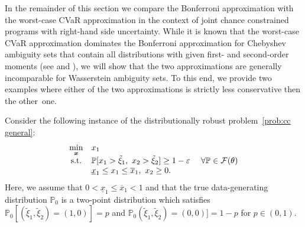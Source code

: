 \documentclass[nonblindrev]{informs2017}
\newcommand{\1}[1]{\mathds{1}{\left(#1\right)}}
\begin{document}
In the remainder of this section we compare the Bonferroni approximation with the worst-case CVaR approximation in the context of joint chance constrained programs with right-hand side uncertainty. While it is known that the worst-case CVaR approximation dominates the Bonferroni approximation for Chebyshev ambiguity sets that contain all distributions with given first- and second-order moments (see \citealt{Chen_Sim_Sun_Teo_2010} and \citealt{zymler2013distributionally}), we will show that the two approximations are generally incomparable for Wasserstein ambiguity sets. To this end, we provide two examples where either of the two approximations is strictly less conservative then the other~one.
%

\begin{example}
	Consider the following instance of the distributionally robust problem~\eqref{prob:cc general}:
	\begin{equation}\label{data_driven_1}
	\begin{array}{cll}
	\displaystyle \min_{\bm{x}} & x_1 \\
	{\rm s.t.} & \displaystyle \mathbb{P} [x_1 > \tilde{\xi}_1, ~x_2 > \tilde{\xi}_2] \geq 1-\varepsilon &~\forall \mathbb{P} \in \mathcal{F}(\theta) \\
	& \underline{x}_1 \leq x_1 \leq \overline{x}_1, ~x_2 \geq 0.
	\end{array}
	\end{equation}
	Here, we assume that $0 < \underline{x}_1 \leq \overline{x}_1 < 1$ and that the true data-generating distribution $\mathbb{P}_0$ is a two-point distribution which satisfies $\mathbb{P}_0 [(\tilde{\xi}_1, \tilde{\xi}_2) = (1,0)] = p$ and $\mathbb{P}_0 (\tilde{\xi}_1, \tilde{\xi}_2) = (0,0)] = 1-p$ for $p \in (0, 1)$.
\end{example}
\end{document}
